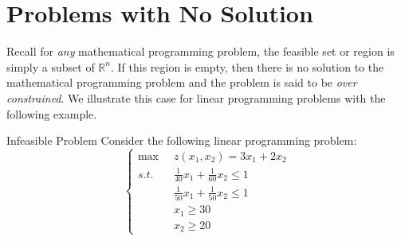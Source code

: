 \section{Problems with No Solution} Recall for \textit{any} mathematical programming problem, the feasible set or region is simply a subset of $\mathbb{R}^n$. If this region is empty, then there is no solution to the mathematical programming problem and the problem is said to be \textit{over constrained}. We illustrate this case for linear programming problems with the following example.
\begin{example}{Infeasible Problem}
 Consider the following linear programming problem:
\begin{equation}
\left\{
\begin{aligned}
\max\;\;& z(x_1,x_2) = 3x_1 + 2x_2\\
s.t.\;\;&  \frac{1}{40}x_1 + \frac{1}{60}x_2 \leq 1\\
& \frac{1}{50}x_1 + \frac{1}{50}x_2 \leq 1\\
& x_1 \geq 30\\
& x_2 \geq 20
\end{aligned}
\right.
\label{eqn:LPInfeasible}
\end{equation}
\end{example}
